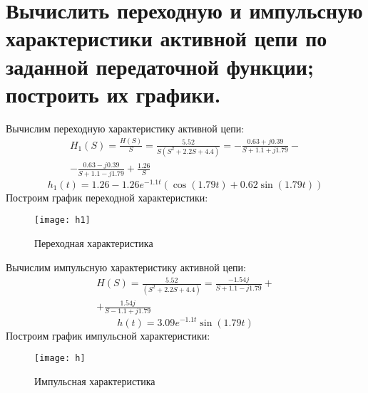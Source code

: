 \documentclass[a4paper,14pt ]{article} %
\begin{document}
    \section{Вычислить переходную и 
    импульсную характеристики активной цепи по
     заданной передаточной функции; построить их графики.}
    Вычислим переходную характеристику активной цепи:
    \begin{multline}
        H_1(S) = \frac{H(S)}{S}= \frac{5.52}{S(S^2 + 2.2S+ 4.4)} = 
        -\frac{0.63 + j0.39}{S+1.1 + j1.79} - \\ - \frac{0.63 - j0.39}{S + 1.1 - j1.79} + \frac{1.26}{S} 
    \end{multline}
    \begin{equation}
        h_1(t) = 1.26 - 1.26e^{-1.1t}(\cos(1.79t) + 0.62\sin(1.79t))
    \end{equation}
    Построим график переходной характеристики:
    \begin{figure}[H]
        \texttt{[image: h1]}
        \centering
        \caption{Переходная характеристика}
    \end{figure}
    Вычислим импульсную характеристику активной цепи:
    \begin{multline}
        H(S) = \frac{5.52}{(S^2 + 2.2S+ 4.4)} = \frac{-1.54j}{S + 1.1 - j1.79} + \\ 
        + \frac{1.54j}{S - 1.1 + j1.79}
    \end{multline}
    \begin{equation}
        h(t) = 3.09e^{-1.1t}\sin(1.79t)
    \end{equation}
    Построим график импульсной характеристики:
    \begin{figure}[H]
        \texttt{[image: h]}
        \centering
        \caption{Импульсная характеристика}
    \end{figure}
\end{document}
